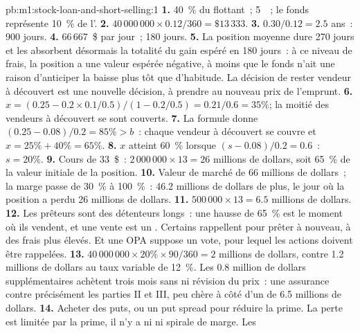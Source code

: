 \begin{solution}{pb:m1:stock-loan-and-short-selling:1}
\textbf{1.} 40~\% du flottant~; 5~~; le fonds représente 10~\% de l'.
\textbf{2.} $40\,000\,000 \times 0.12/360 = \$13\,333$.
\textbf{3.} $0.30/0.12 = 2.5$ ans~: 900 jours.
\textbf{4.} 66\,667~\$ par jour~; 180 jours.
\textbf{5.} La position moyenne dure 270 jours et les  absorbent désormais la
totalité du gain espéré en 180 jours~: à ce niveau de frais, la position a une valeur
espérée négative, à moins que le fonds n'ait une raison d'anticiper la baisse plus tôt que d'habitude. La
décision de rester vendeur à découvert est une nouvelle décision, à prendre au nouveau prix de
l'emprunt.
\textbf{6.} $x = (0.25 - 0.2 \times 0.1/0.5)/(1 - 0.2/0.5) = 0.21/0.6 = 35\%$;
la moitié des vendeurs à découvert se sont couverts.
\textbf{7.} La formule donne $(0.25 - 0.08)/0.2 = 85\% > b$~: chaque vendeur à découvert
se couvre et $x = 25\% + 40\% = 65\%$.
\textbf{8.} $x$ atteint 60~\% lorsque $(s - 0.08)/0.2 = 0.6$~: $s = 20\%$.
\textbf{9.} Cours de 33~\$~: $2\,000\,000 \times 13 = 26$ millions de dollars, soit 65~\% de la
valeur initiale de la position.
\textbf{10.} Valeur de marché de 66 millions de dollars~; la marge passe de 30~\% à 100~\%~:
46.2 millions de dollars de plus, le jour où la position a perdu 26 millions de dollars.
\textbf{11.} $500\,000 \times 13 = 6.5$ millions de dollars.
\textbf{12.} Les prêteurs sont des détenteurs longs~: une hausse de 65~\% est le moment où ils vendent, et une
vente est un . Certains rappellent pour prêter à nouveau, à des frais plus élevés. Et une
OPA suppose un vote, pour lequel les actions doivent être rappelées.
\textbf{13.} $40\,000\,000 \times 20\% \times 90/360 = 2$ millions de dollars, contre
1.2 millions de dollars au taux variable de 12~\%. Les 0.8 million de dollars supplémentaires achètent trois mois
sans  ni révision du prix~: une assurance contre précisément les parties II et
III, peu chère à côté d'un  de 6.5 millions de dollars.
\textbf{14.} Acheter des puts, ou un put spread pour réduire la prime. La perte est
limitée par la prime, il n'y a ni  ni spirale de marge. Les 
\end{solution}

